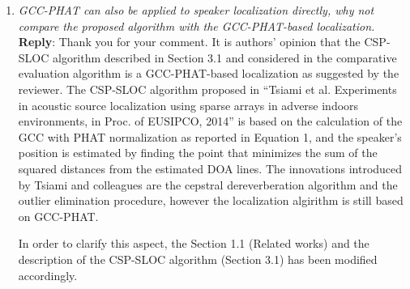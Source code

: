 \documentclass[11pt, technote, letterpaper, oneside, onecolumn]{IEEEtran}
\begin{document}
\begin{enumerate}
\item  \textit{GCC-PHAT can also be applied to speaker localization directly, why not compare the proposed algorithm with the GCC-PHAT-based localization. \\}
\textbf{Reply}: Thank you for your comment. It is authors' opinion that the CSP-SLOC algorithm described in Section 3.1 and considered in the comparative evaluation algorithm is a GCC-PHAT-based localization as suggested by the reviewer. The CSP-SLOC algorithm proposed in ``Tsiami et al. Experiments in acoustic source localization using sparse arrays in adverse indoors environments, in Proc. of EUSIPCO, 2014'' is based on the calculation of the GCC with PHAT normalization as reported in Equation 1, and the speaker's position is estimated by finding the point that minimizes the sum of the squared distances from the estimated DOA lines. The innovations introduced by Tsiami and colleagues are the cepstral dereverberation algorithm and the outlier elimination procedure, however the localization algirithm is still based on GCC-PHAT.

In order to clarify this aspect, the Section 1.1 (Related works) and the description of the CSP-SLOC algorithm (Section 3.1) has been modified accordingly.


\end{enumerate}
\end{document}
